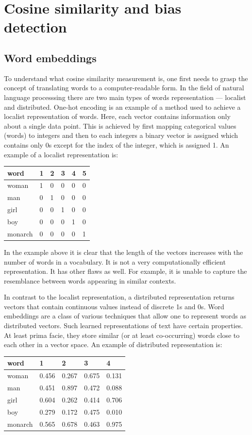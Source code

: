 \documentclass[12pt,]{book}
\begin{document}
\chapter{Cosine similarity and bias
detection}\label{cosine-similarity-and-bias-detection}

\section{Word embeddings}\label{word-embeddings}

To understand what cosine similarity measurement is, one first needs to
grasp the concept of translating words to a computer-readable form. In
the field of natural language processsing there are two main types of
words representation --- localist and distributed. One-hot encoding is
an example of a method used to achieve a localist representation of
words. Here, each vector contains information only about a single data
point. This is achieved by first mapping categorical values (words) to
integers and then to each integers a binary vector is assigned which
contains only 0s except for the index of the integer, which is assigned
1. An example of a localist representation is:

\begin{longtable}[]{@{}llllll@{}}
\toprule
word & 1 & 2 & 3 & 4 & 5\tabularnewline
\midrule
\endhead
woman & 1 & 0 & 0 & 0 & 0\tabularnewline
man & 0 & 1 & 0 & 0 & 0\tabularnewline
girl & 0 & 0 & 1 & 0 & 0\tabularnewline
boy & 0 & 0 & 0 & 1 & 0\tabularnewline
monarch & 0 & 0 & 0 & 0 & 1\tabularnewline
\bottomrule
\end{longtable}

In the example above it is clear that the length of the vectors
increases with the number of words in a vocabulary. It is not a very
computationally efficient representation. It has other flaws as well.
For example, it is unable to capture the resemblance between words
appearing in similar contexts.

In contrast to the localist representation, a distributed representation
returns vectors that contain continuous values instead of discrete 1s
and 0s. Word embeddings are a class of various techniques that allow one
to represent words as distributed vectors. Such learned representations
of text have certain properties. At least prima facie, they store
similar (or at least co-occurring) words close to each other in a vector
space. An example of distributed representation is:

\begin{longtable}[]{@{}lllll@{}}
\toprule
word & 1 & 2 & 3 & 4\tabularnewline
\midrule
\endhead
woman & 0.456 & 0.267 & 0.675 & 0.131\tabularnewline
man & 0.451 & 0.897 & 0.472 & 0.088\tabularnewline
girl & 0.604 & 0.262 & 0.414 & 0.706\tabularnewline
boy & 0.279 & 0.172 & 0.475 & 0.010\tabularnewline
monarch & 0.565 & 0.678 & 0.463 & 0.975\tabularnewline
\bottomrule
\end{longtable}
\end{document}
